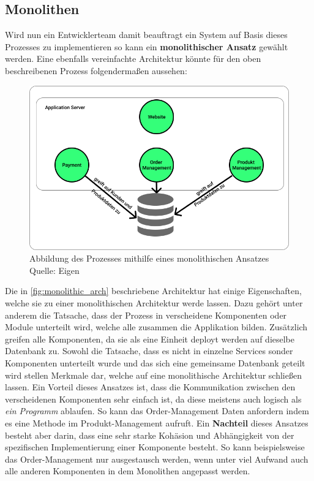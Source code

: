 \subsection{Monolithen}
Wird nun ein Entwicklerteam damit beauftragt ein System auf Basis dieses Prozesses zu implementieren so kann ein \textbf{monolithischer Ansatz} gewählt werden. Eine ebenfalls vereinfachte Architektur könnte für den oben beschreibenen Prozess folgendermaßen aussehen:

\begin{figure}[h]
	\centering
	\includegraphics[width=1.0\linewidth]{img/monolitische_architektur.png}
	\caption[monolitische Architektur]{Abbildung des Prozesses mithilfe eines monolithischen Ansatzes\\Quelle: Eigen}
	\label{fig:monolithic_arch}
\end{figure}

Die in \vref{fig:monolithic_arch} beschriebene Architektur hat einige Eigenschaften, welche sie zu einer monolithischen Architektur werde lassen. Dazu gehört unter anderem die Tatsache, dass der Prozess in verscheidene Komponenten oder Module unterteilt wird, welche alle zusammen die Applikation bilden. Zusätzlich greifen alle Komponenten, da sie als eine Einheit deployt werden auf dieselbe Datenbank zu. Sowohl die Tatsache, dass es nicht in einzelne Services sonder Komponenten unterteilt wurde und das sich eine gemeinsame Datenbank geteilt wird stellen Merkmale dar, welche auf eine monolithische Architektur schließen lassen. Ein Vorteil dieses Ansatzes ist, dass die Kommunikation zwischen den verscheidenen Komponenten sehr einfach ist, da diese meistens auch logisch als \textit{ein Programm} ablaufen. So kann das Order-Management Daten anfordern indem es eine Methode im Produkt-Management aufruft. Ein \textbf{Nachteil} dieses Ansatzes besteht aber darin, dass eine sehr starke Kohäsion und Abhängigkeit von der spezifischen Implementierung einer Komponente besteht. So kann beispielsweise das Order-Management nur ausgestausch werden, wenn unter viel Aufwand auch alle anderen Komponenten in dem Monolithen angepasst werden. 

